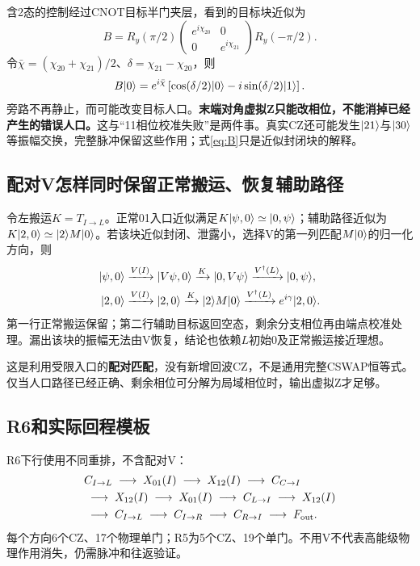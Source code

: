 含2态的控制经过CNOT目标半门夹层，看到的目标块近似为
\begin{equation}\label{eq:B}
 B=R_y(\pi/2)\begin{pmatrix}e^{i\chi_{20}}&0\\0&e^{i\chi_{21}}\end{pmatrix}R_y(-\pi/2).
\end{equation}
令$\bar\chi=(\chi_{20}+\chi_{21})/2$、$\delta=\chi_{21}-\chi_{20}$，则
\begin{equation}\label{eq:Baction}
 B\lvert 0\rangle=e^{i\bar\chi}\left[\cos(\delta/2)\lvert 0\rangle-i\sin(\delta/2)\lvert 1\rangle\right].
\end{equation}
旁路不再静止，而可能改变目标人口。\textbf{末端对角虚拟Z只能改相位，不能消掉已经产生的错误人口。}这与“11相位校准失败”是两件事。真实CZ还可能发生$\lvert 21\rangle$与$\lvert 30\rangle$等振幅交换，完整脉冲保留这些作用；式\eqref{eq:B}只是近似封闭块的解释。

\subsection{配对V怎样同时保留正常搬运、恢复辅助路径}
令左搬运$K=T_{I\to L}$。正常01入口近似满足$K\lvert \psi,0\rangle\simeq\lvert 0,\psi\rangle$；辅助路径近似为$K\lvert 2,0\rangle\simeq\lvert 2\rangle M\lvert 0\rangle$。若该块近似封闭、泄露小，选择V的第一列匹配$M\lvert 0\rangle$的归一化方向，则
\begin{align}
 \lvert \psi,0\rangle&\xrightarrow{V(I)}\lvert V\psi,0\rangle
 \xrightarrow{K}\lvert 0,V\psi\rangle\xrightarrow{V^\dagger(L)}\lvert 0,\psi\rangle,\label{eq:pairnormal}\\
 \lvert 2,0\rangle&\xrightarrow{V(I)}\lvert 2,0\rangle
 \xrightarrow{K}\lvert 2\rangle M\lvert 0\rangle\xrightarrow{V^\dagger(L)}e^{i\gamma}\lvert 2,0\rangle.\label{eq:pairaux}
\end{align}
第一行正常搬运保留；第二行辅助目标返回空态，剩余分支相位再由端点校准处理。漏出该块的振幅无法由V恢复，结论也依赖$L$初始0及正常搬运接近理想。

这是利用受限入口的\textbf{配对匹配}，没有新增回波CZ，不是通用完整CSWAP恒等式。仅当人口路径已经正确、剩余相位可分解为局域相位时，输出虚拟Z才足够。

\subsection{R6和实际回程模板}
R6下行使用不同重排，不含配对V：
\begin{equation}\label{eq:r6}
\begin{aligned}
 &C_{I\to L}\;\longrightarrow\; X_{01}(I)\;\longrightarrow\; X_{12}(I)\;\longrightarrow\; C_{C\to I}\\
 &\;\longrightarrow\; X_{12}(I)\;\longrightarrow\; X_{01}(I)\;\longrightarrow\; C_{L\to I}\;\longrightarrow\; X_{12}(I)\\
 &\;\longrightarrow\; C_{I\to L}\;\longrightarrow\; C_{I\to R}\;\longrightarrow\; C_{R\to I}\;\longrightarrow\; F_{\rm out}.
\end{aligned}
\end{equation}
每个方向6个CZ、17个物理单门；R5为5个CZ、19个单门。不用V不代表高能级物理作用消失，仍需脉冲和往返验证。

